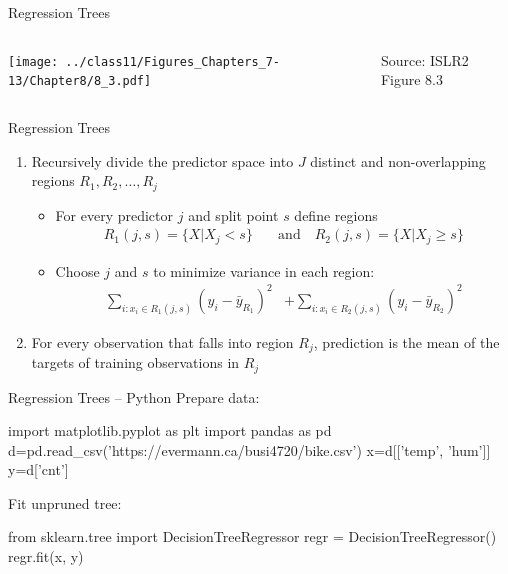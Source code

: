 \documentclass[ignorenonframetext,xcolor=x11names]{beamer}
\begin{document}
\begin{frame}{Regression Trees}
\begin{columns}
\begin{column}{.8\textwidth}
\texttt{[image: ../class11/Figures\_Chapters\_7-13/Chapter8/8\_3.pdf]} 
\end{column}
\begin{column}{.2\textwidth}
\scriptsize Source: ISLR2 Figure 8.3
\end{column}
\end{columns}
\end{frame}

\begin{frame}{Regression Trees}
\begin{enumerate}
   \item Recursively divide the predictor space into $J$ distinct and non-overlapping regions $R_1, R_2, \ldots, R_j$
   \begin{itemize}
   \vspace{\baselineskip}
       \item For every predictor $j$ and split point $s$ define regions
       \begin{align*}
       R_1(j,s) = \{X | X_j < s\} \quad &\text{and} \quad R_2(j, s) = \{X | X_j \geq s\}
       \end{align*}
       \item Choose $j$ and $s$ to minimize variance in each region:
       \begin{align*}
       \sum_{i: x_i \in R_1(j,s)} (y_i - \bar{y}_{R_1})^2 &+ \sum_{i: x_i \in R_2(j,s)} (y_i - \bar{y}_{R_2})^2
       \end{align*}
   \end{itemize}
   \item For every observation that falls into region $R_j$, prediction is the mean of the targets of training observations in $R_j$
\end{enumerate}
\end{frame}

\begin{frame}[fragile]{Regression Trees -- Python}
Prepare data:
\begin{pythoncode}
import matplotlib.pyplot as plt
import pandas as pd
d=pd.read_csv('https://evermann.ca/busi4720/bike.csv')
x=d[['temp', 'hum']]
y=d['cnt']
\end{pythoncode}
Fit unpruned tree:
\begin{pythoncode}
from sklearn.tree import DecisionTreeRegressor
regr = DecisionTreeRegressor()
regr.fit(x, y)
\end{pythoncode}
\end{frame}
\end{document}
